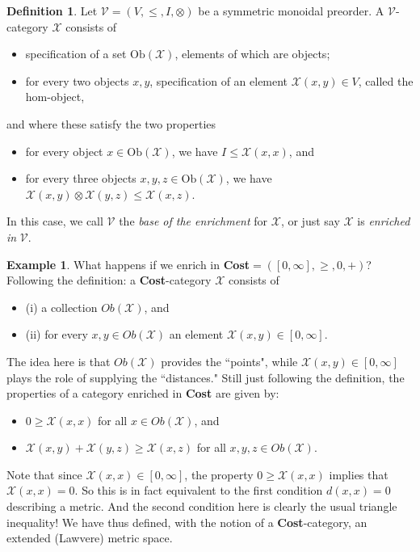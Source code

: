 \documentclass[a4paper]{book}
\theoremstyle{definition}
\newtheorem{example}{Example}[section]
\theoremstyle{definition}
\newtheorem{definition}{Definition}[section]
\theoremstyle{definition}
\theoremstyle{theorem}
\theoremstyle{definition}
\begin{document}
\begin{definition}
	Let $\mathcal{V} = (V, \leq, I, \otimes)$ be a symmetric monoidal preorder. A $\mathcal{V}$-category  $\mathcal{X}$ consists of
	\begin{itemize}
		\item specification of a set $\text{Ob}(\mathcal{X})$, elements of which are objects; 
		\item for every two objects $x, y$, specification of an element $\mathcal{X}(x,y) \in V$, called the hom-object, 
	\end{itemize}
	and where these satisfy the two properties 
	\begin{itemize}
		\item for every object $x \in \text{Ob}(\mathcal{X})$, we have $I \leq \mathcal{X}(x,x)$, and 
		\item for every three objects $x, y,z \in \text{Ob}(\mathcal{X})$, we have $\mathcal{X}(x,y) \otimes \mathcal{X}(y,z) \leq \mathcal{X}(x,z)$. 
	\end{itemize}
	In this case, we call $\mathcal{V}$ the \textit{base of the enrichment} for $\mathcal{X}$, or just say $\mathcal{X}$ is \textit{enriched in} $\mathcal{V}$. 
\end{definition}
\begin{example} 
	What happens if we enrich in \textbf{Cost}$= ([0, \infty], \geq, 0, +)$? Following the definition: a \textbf{Cost}-category $\mathcal{X}$ consists of 
	\begin{itemize}
		\item (i) a collection $Ob(\mathcal{X})$, and 
		\item (ii) for every $x, y \in Ob(\mathcal{X})$ an element $\mathcal{X}(x,y) \in [0, \infty]$.
	\end{itemize}
	The idea here is that $Ob(\mathcal{X})$ provides the ``points", while $\mathcal{X}(x,y) \in [0, \infty]$ plays the role of supplying the ``distances." Still just following the definition, the properties of a category enriched in \textbf{Cost} are given by:  
	\begin{itemize}
		\item $0 \geq \mathcal{X}(x,x)$ for all $x \in Ob(\mathcal{X})$, and 
		\item $\mathcal{X}(x,y) + \mathcal{X}(y,z) \geq \mathcal{X}(x,z)$ for all $x,y,z \in Ob(\mathcal{X})$.  
	\end{itemize} 
	Note that since $\mathcal{X}(x,x) \in [0, \infty]$, the property $0 \geq \mathcal{X}(x,x)$ implies that $\mathcal{X}(x,x) = 0$. So this is in fact equivalent to the first condition $d(x,x) = 0$ describing a metric. And the second condition here is clearly the usual triangle inequality! We have thus defined, with the notion of a \textbf{Cost}-category, an extended (Lawvere) metric space.
\end{example} \noindent 
\end{document}
